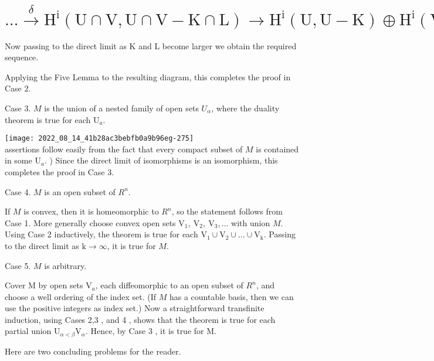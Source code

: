 \documentclass[10pt]{article}
\begin{document}
\section{$\ldots \stackrel{\delta}{\rightarrow} \mathrm{H}^{\mathrm{i}}(\mathrm{U} \cap \mathrm{V}, \mathrm{U} \cap \mathrm{V}-\mathrm{K} \cap \mathrm{L}) \rightarrow \mathrm{H}^{\mathrm{i}}(\mathrm{U}, \mathrm{U}-\mathrm{K}) \oplus \mathrm{H}^{\mathrm{i}}(\mathrm{V}, \mathrm{V}-\mathrm{L}) \rightarrow \mathrm{H}^{\mathrm{i}}(\mathrm{M}, \mathrm{M}-\mathrm{K} \cup \mathrm{L}) \rightarrow \ldots .$}
Now passing to the direct limit as $\mathrm{K}$ and $\mathrm{L}$ become larger we obtain the required sequence.

Applying the Five Lemma to the resulting diagram, this completes the proof in Case $2 .$

Case 3. $M$ is the union of a nested family of open sets $U_{\alpha}$, where the duality theorem is true for each $\mathrm{U}_{a}$.

\texttt{[image: 2022\_08\_14\_41b28ac3bebfb0a9b96eg-275]}\\
assertions follow easily from the fact that every compact subset of $M$ is contained in some $\mathrm{U}_{a} .$ ) Since the direct limit of isomorphisms is an isomorphism, this completes the proof in Case $3 .$

Case 4. $M$ is an open subset of $R^{n}$.

If $M$ is convex, then it is homeomorphic to $R^{n}$, so the statement follows from Case 1. More generally choose convex open sets $\mathrm{V}_{1}, \mathrm{~V}_{2}, \mathrm{~V}_{3}, \ldots$ with union $M$. Using Case 2 inductively, the theorem is true for each $\mathrm{V}_{1} \cup \mathrm{V}_{2} \cup \ldots \cup \mathrm{V}_{\mathrm{k}}$. Passing to the direct limit as $\mathrm{k} \rightarrow \infty$, it is true for $M$.

Case 5. $M$ is arbitrary.

Cover $\mathrm{M}$ by open sets $\mathrm{V}_{a}$, each diffeomorphic to an open subset of $R^{n}$, and choose a well ordering of the index set. (If $M$ has a countable basis, then we can use the positive integers as index set.) Now a straightforward transfinite induction, using Cases 2,3 , and 4 , shows that the theorem is true for each partial union $\mathrm{U}_{\alpha<\beta} \mathrm{V}_{\alpha}$. Hence, by Case 3 , it is true for M.

Here are two concluding problems for the reader.
\end{document}
